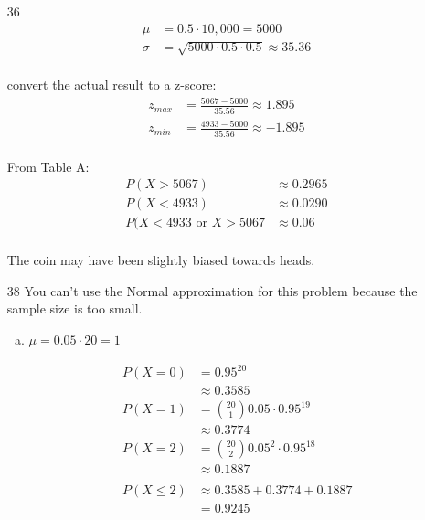 \documentclass[letterpaper, landscape]{exam}
\begin{document}
\begin{description}
\begin{enumerate}[(a)]
          \item[36]
            \begin{align*}
              \mu    & = 0.5 \cdot 10,000 = 5000 \\
              \sigma & = \sqrt{5000 \cdot 0.5 \cdot 0.5} \approx 35.36 \\
            \end{align*}

            convert the actual result to a z-score:
            \begin{align*}
              z_{max} &= \frac{5067 - 5000}{35.56} \approx 1.895 \\
              z_{min} &= \frac{4933 - 5000}{35.56} \approx -1.895 \\
            \end{align*}

            From Table A:
            \begin{align*}
              P(X > 5067) & \approx 0.2965 \\
              P(X < 4933) & \approx 0.0290 \\
              P(X < 4933 \text{ or } X > 5067 &\approx \boxed{ 0.06 } \\
            \end{align*}

            The coin may have been slightly biased towards heads.

        \item[38]
          You can't use the Normal approximation for this problem because the
          sample size is too small.

          \begin{enumerate}[(a)]
            \item 
              $\mu = 0.05 \cdot 20 = \boxed{ 1 }$

              \begin{align*}
                P(X = 0) & = 0.95^{20} \\
                         & \approx 0.3585 \\
                P(X = 1) & = \binom{20}{1} 0.05 \cdot 0.95^{19} \\
                         & \approx 0.3774 \\
                P(X = 2) & = \binom{20}{2} 0.05^2 \cdot 0.95^{18} \\
                         & \approx 0.1887 \\
                         \\
                P(X \leq 2) & \approx 0.3585 + 0.3774 + 0.1887 \\
                            & = \boxed{ 0.9245 }
              \end{align*}


\end{enumerate}
\end{enumerate}
\end{description}
\end{document}
